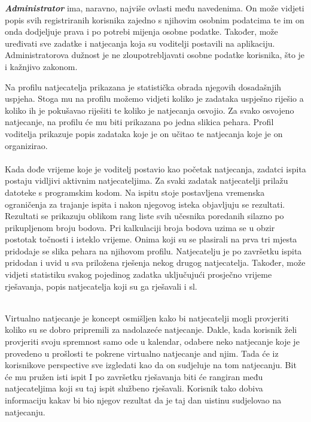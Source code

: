 	    \textbf{\textit{Administrator}} ima, naravno, najviše ovlasti među navedenima. On može vidjeti popis svih registriranih korisnika zajedno s njihovim osobnim podatcima te im on onda dodjeljuje prava i po potrebi mijenja osobne podatke. Također, može uređivati sve zadatke i natjecanja koja su voditelji postavili na aplikaciju. Administratorova dužnost je ne zloupotrebljavati osobne podatke korisnika, što je i kažnjivo zakonom.
	    
	    Na profilu natjecatelja prikazana je statistička obrada njegovih dosadašnjih uspjeha. Stoga mu na profilu možemo vidjeti koliko je zadataka uspješno riješio a koliko ih je pokušavao riješiti te koliko je natjecanja osvojio. Za svako osvojeno natjecanje, na profilu će mu biti prikazana po jedna slikica pehara.
	    Profil voditelja prikazuje popis zadataka koje je on učitao te natjecanja koje je on organizirao. \\
	
		\\
		Kada dođe vrijeme koje je voditelj postavio kao početak natjecanja, zadatci ispita postaju vidljivi aktivnim natjecateljima. Za svaki zadatak natjecatelji prilažu datoteke s programskim kodom. Na ispitu stoje postavljena vremenska ograničenja za trajanje ispita i nakon njegovog isteka objavljuju se rezultati. Rezultati se prikazuju oblikom rang liste svih učesnika poredanih silazno po prikupljenom broju bodova. Pri kalkulaciji broja bodova uzima se u obzir postotak točnosti i isteklo vrijeme. Onima koji su se plasirali na prva tri mjesta pridodaje se slika pehara na njihovom profilu.
		Natjecatelju je po završetku ispita pridodan i uvid u sva priložena rješenja nekog drugog natjecatelja. Također, može vidjeti statistiku svakog pojedinog zadatka uključujući prosječno vrijeme rješavanja, popis natjecatelja koji su ga rješavali i sl.
		
		
		\\
		Virtualno natjecanje je koncept osmišljen kako bi natjecatelji mogli provjeriti koliko su se dobro pripremili za nadolazeće natjecanje. Dakle, kada korisnik želi provjeriti svoju spremnost samo ode u kalendar, odabere neko natjecanje koje je provedeno u prošlosti te pokrene virtualno natjecanje and njim. Tada će iz korisnikove perspective sve izgledati kao da on sudjeluje na tom natjecanju. Bit će mu pružen isti ispit I po završetku rješavanja biti će rangiran među natjecateljima koji su taj ispit službeno rješavali. Korisnik tako dobiva informaciju kakav bi bio njegov rezultat da je taj dan uistinu sudjelovao na natjecanju.\\
		

